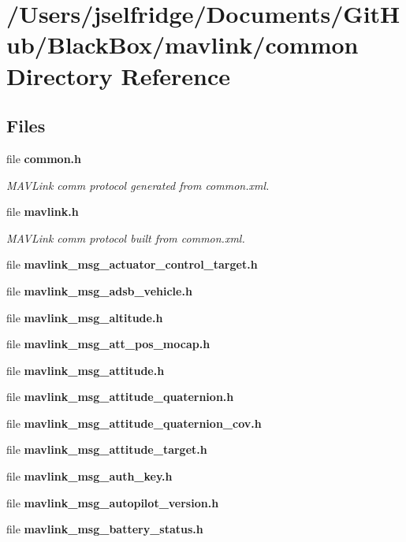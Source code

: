 \section{/\+Users/jselfridge/\+Documents/\+Git\+Hub/\+Black\+Box/mavlink/common Directory Reference}
\label{dir_bc1f692f6c17f3dddee7413b5ff97012}
\subsection*{Files}
\begin{DoxyCompactItemize}
\item 
file \textbf{ common.\+h}
\begin{DoxyCompactList}\small\item\em M\+A\+V\+Link comm protocol generated from common.\+xml. \end{DoxyCompactList}\item 
file \textbf{ mavlink.\+h}
\begin{DoxyCompactList}\small\item\em M\+A\+V\+Link comm protocol built from common.\+xml. \end{DoxyCompactList}\item 
file \textbf{ mavlink\+\_\+msg\+\_\+actuator\+\_\+control\+\_\+target.\+h}
\item 
file \textbf{ mavlink\+\_\+msg\+\_\+adsb\+\_\+vehicle.\+h}
\item 
file \textbf{ mavlink\+\_\+msg\+\_\+altitude.\+h}
\item 
file \textbf{ mavlink\+\_\+msg\+\_\+att\+\_\+pos\+\_\+mocap.\+h}
\item 
file \textbf{ mavlink\+\_\+msg\+\_\+attitude.\+h}
\item 
file \textbf{ mavlink\+\_\+msg\+\_\+attitude\+\_\+quaternion.\+h}
\item 
file \textbf{ mavlink\+\_\+msg\+\_\+attitude\+\_\+quaternion\+\_\+cov.\+h}
\item 
file \textbf{ mavlink\+\_\+msg\+\_\+attitude\+\_\+target.\+h}
\item 
file \textbf{ mavlink\+\_\+msg\+\_\+auth\+\_\+key.\+h}
\item 
file \textbf{ mavlink\+\_\+msg\+\_\+autopilot\+\_\+version.\+h}
\item 
file \textbf{ mavlink\+\_\+msg\+\_\+battery\+\_\+status.\+h}
\item 

\end{DoxyCompactItemize}
